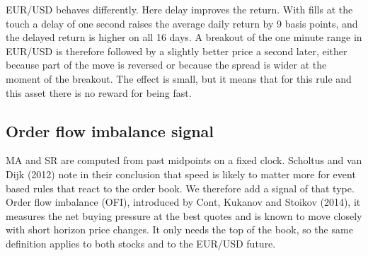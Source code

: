 \documentclass{article}
\begin{document}
EUR/USD behaves differently. Here delay improves the return. With fills at the touch a delay of one second raises the average daily return by 9 basis points, and the delayed return is higher on all 16 days. A breakout of the one minute range in EUR/USD is therefore followed by a slightly better price a second later, either because part of the move is reversed or because the spread is wider at the moment of the breakout. The effect is small, but it means that for this rule and this asset there is no reward for being fast.

\subsection{Order flow imbalance signal}

MA and SR are computed from past midpoints on a fixed clock. Scholtus and van Dijk (2012) note in their conclusion that speed is likely to matter more for event based rules that react to the order book. We therefore add a signal of that type. Order flow imbalance (OFI), introduced by Cont, Kukanov and Stoikov (2014), it measures the net buying pressure at the best quotes and is known to move closely with short horizon price changes. It only needs the top of the book, so the same definition applies to both stocks and to the EUR/USD future.\\
\end{document}
